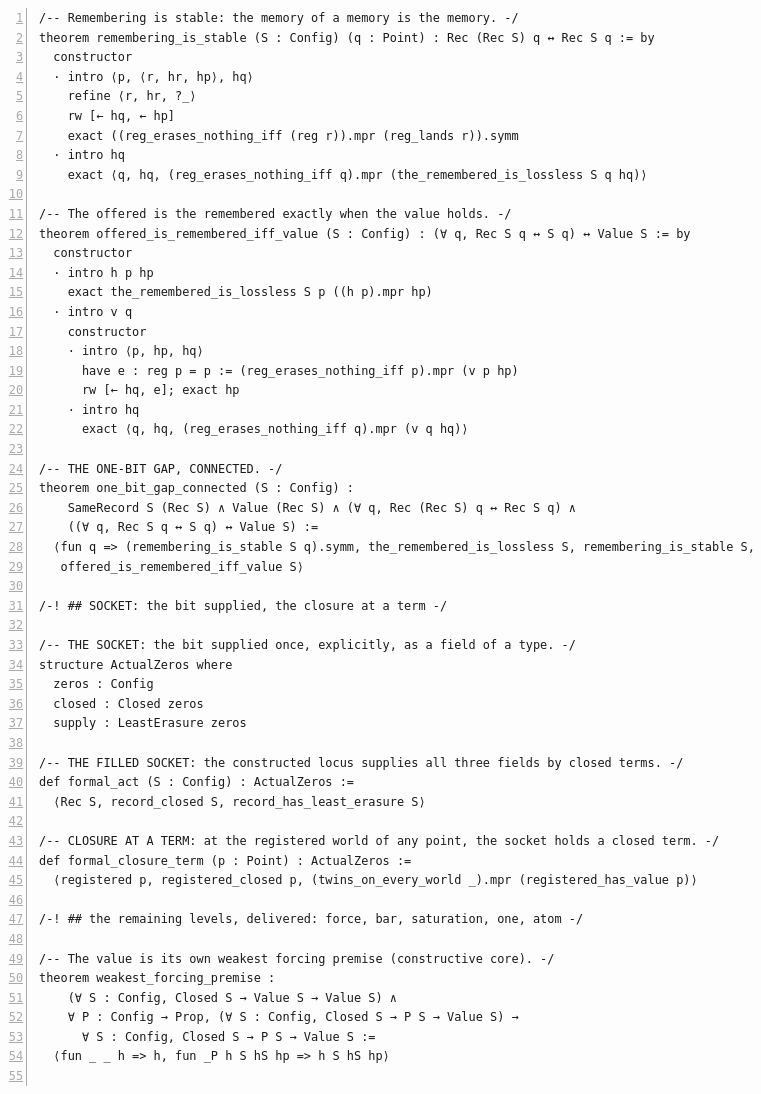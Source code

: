 \documentclass[10pt]{article}
\newcommand{\leansize}{\fontsize{5.5pt}{6.75pt}\selectfont}
\begin{document}
\begin{multicols}{2}
\begin{Verbatim}[numbers=left,firstnumber=1,numbersep=3pt,xleftmargin=2.6em,breaklines=true,breakanywhere=true,breakautoindent=false,breakindent=1.4em,breaksymbolleft={},breakanywheresymbolpre={},fontsize=\leansize]
/-- Remembering is stable: the memory of a memory is the memory. -/
theorem remembering_is_stable (S : Config) (q : Point) : Rec (Rec S) q ↔ Rec S q := by
  constructor
  · intro ⟨p, ⟨r, hr, hp⟩, hq⟩
    refine ⟨r, hr, ?_⟩
    rw [← hq, ← hp]
    exact ((reg_erases_nothing_iff (reg r)).mpr (reg_lands r)).symm
  · intro hq
    exact ⟨q, hq, (reg_erases_nothing_iff q).mpr (the_remembered_is_lossless S q hq)⟩

/-- The offered is the remembered exactly when the value holds. -/
theorem offered_is_remembered_iff_value (S : Config) : (∀ q, Rec S q ↔ S q) ↔ Value S := by
  constructor
  · intro h p hp
    exact the_remembered_is_lossless S p ((h p).mpr hp)
  · intro v q
    constructor
    · intro ⟨p, hp, hq⟩
      have e : reg p = p := (reg_erases_nothing_iff p).mpr (v p hp)
      rw [← hq, e]; exact hp
    · intro hq
      exact ⟨q, hq, (reg_erases_nothing_iff q).mpr (v q hq)⟩

/-- THE ONE-BIT GAP, CONNECTED. -/
theorem one_bit_gap_connected (S : Config) :
    SameRecord S (Rec S) ∧ Value (Rec S) ∧ (∀ q, Rec (Rec S) q ↔ Rec S q) ∧
    ((∀ q, Rec S q ↔ S q) ↔ Value S) :=
  ⟨fun q => (remembering_is_stable S q).symm, the_remembered_is_lossless S, remembering_is_stable S,
   offered_is_remembered_iff_value S⟩

/-! ## SOCKET: the bit supplied, the closure at a term -/

/-- THE SOCKET: the bit supplied once, explicitly, as a field of a type. -/
structure ActualZeros where
  zeros : Config
  closed : Closed zeros
  supply : LeastErasure zeros

/-- THE FILLED SOCKET: the constructed locus supplies all three fields by closed terms. -/
def formal_act (S : Config) : ActualZeros :=
  ⟨Rec S, record_closed S, record_has_least_erasure S⟩

/-- CLOSURE AT A TERM: at the registered world of any point, the socket holds a closed term. -/
def formal_closure_term (p : Point) : ActualZeros :=
  ⟨registered p, registered_closed p, (twins_on_every_world _).mpr (registered_has_value p)⟩

/-! ## the remaining levels, delivered: force, bar, saturation, one, atom -/

/-- The value is its own weakest forcing premise (constructive core). -/
theorem weakest_forcing_premise :
    (∀ S : Config, Closed S → Value S → Value S) ∧
    ∀ P : Config → Prop, (∀ S : Config, Closed S → P S → Value S) →
      ∀ S : Config, Closed S → P S → Value S :=
  ⟨fun _ _ h => h, fun _P h S hS hp => h S hS hp⟩


\end{Verbatim}
\end{multicols}
\end{document}

